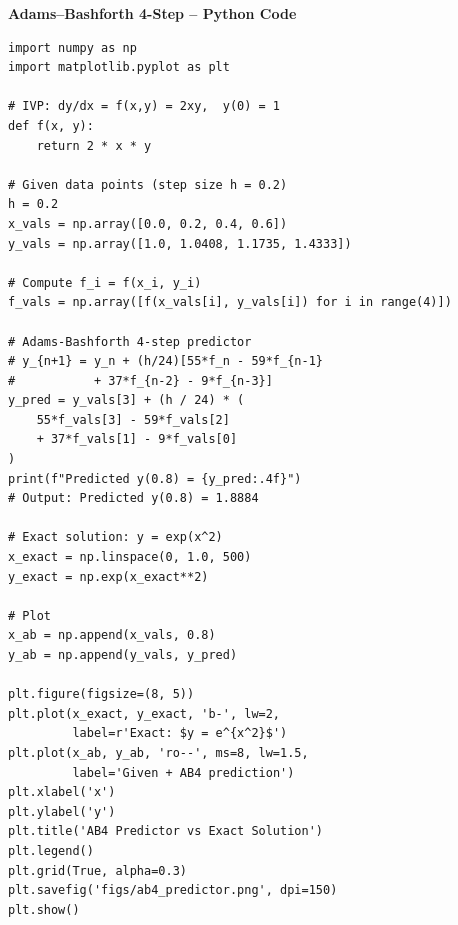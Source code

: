 \documentclass[12pt]{beamer}
\begin{document}
\begin{frame}{\textbf{Adams--Bashforth 4-Step -- Python Code}}
\begin{lstlisting}
import numpy as np
import matplotlib.pyplot as plt

# IVP: dy/dx = f(x,y) = 2xy,  y(0) = 1
def f(x, y):
    return 2 * x * y

# Given data points (step size h = 0.2)
h = 0.2
x_vals = np.array([0.0, 0.2, 0.4, 0.6])
y_vals = np.array([1.0, 1.0408, 1.1735, 1.4333])

# Compute f_i = f(x_i, y_i)
f_vals = np.array([f(x_vals[i], y_vals[i]) for i in range(4)])

# Adams-Bashforth 4-step predictor
# y_{n+1} = y_n + (h/24)[55*f_n - 59*f_{n-1}
#           + 37*f_{n-2} - 9*f_{n-3}]
y_pred = y_vals[3] + (h / 24) * (
    55*f_vals[3] - 59*f_vals[2]
    + 37*f_vals[1] - 9*f_vals[0]
)
print(f"Predicted y(0.8) = {y_pred:.4f}")
# Output: Predicted y(0.8) = 1.8884

# Exact solution: y = exp(x^2)
x_exact = np.linspace(0, 1.0, 500)
y_exact = np.exp(x_exact**2)

# Plot
x_ab = np.append(x_vals, 0.8)
y_ab = np.append(y_vals, y_pred)

plt.figure(figsize=(8, 5))
plt.plot(x_exact, y_exact, 'b-', lw=2,
         label=r'Exact: $y = e^{x^2}$')
plt.plot(x_ab, y_ab, 'ro--', ms=8, lw=1.5,
         label='Given + AB4 prediction')
plt.xlabel('x')
plt.ylabel('y')
plt.title('AB4 Predictor vs Exact Solution')
plt.legend()
plt.grid(True, alpha=0.3)
plt.savefig('figs/ab4_predictor.png', dpi=150)
plt.show()
\end{lstlisting}
\end{frame}
\end{document}
